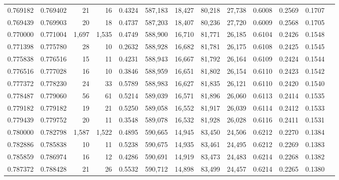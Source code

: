\begin{tabular}{rrrrrrrrrrrrr}
0.769182 & 0.769402 &     21 &    16 &                                     0.4324 & 587,183 &  18,427 &  80,218 &  27,738 & 0.6008 & 0.2569 & 0.1707 \\
0.769439 & 0.769903 &     20 &    18 &                                     0.4737 & 587,203 &  18,407 &  80,236 &  27,720 & 0.6009 & 0.2568 & 0.1705 \\
0.770000 & 0.771004 &  1,697 & 1,535 &                                     0.4749 & 588,900 &  16,710 &  81,771 &  26,185 & 0.6104 & 0.2426 & 0.1548 \\
0.771398 & 0.775780 &     28 &    10 &                                     0.2632 & 588,928 &  16,682 &  81,781 &  26,175 & 0.6108 & 0.2425 & 0.1545 \\
0.775838 & 0.776516 &     15 &    11 &                                     0.4231 & 588,943 &  16,667 &  81,792 &  26,164 & 0.6109 & 0.2424 & 0.1544 \\
0.776516 & 0.777028 &     16 &    10 &                                     0.3846 & 588,959 &  16,651 &  81,802 &  26,154 & 0.6110 & 0.2423 & 0.1542 \\
0.777372 & 0.778230 &     24 &    33 &                                     0.5789 & 588,983 &  16,627 &  81,835 &  26,121 & 0.6110 & 0.2420 & 0.1540 \\
0.778487 & 0.779060 &     56 &    61 &                                     0.5214 & 589,039 &  16,571 &  81,896 &  26,060 & 0.6113 & 0.2414 & 0.1535 \\
0.779182 & 0.779182 &     19 &    21 &                                     0.5250 & 589,058 &  16,552 &  81,917 &  26,039 & 0.6114 & 0.2412 & 0.1533 \\
0.779439 & 0.779752 &     20 &    11 &                                     0.3548 & 589,078 &  16,532 &  81,928 &  26,028 & 0.6116 & 0.2411 & 0.1531 \\
0.780000 & 0.782798 &  1,587 & 1,522 &                                     0.4895 & 590,665 &  14,945 &  83,450 &  24,506 & 0.6212 & 0.2270 & 0.1384 \\
0.782886 & 0.785838 &     10 &    11 &                                     0.5238 & 590,675 &  14,935 &  83,461 &  24,495 & 0.6212 & 0.2269 & 0.1383 \\
0.785859 & 0.786974 &     16 &    12 &                                     0.4286 & 590,691 &  14,919 &  83,473 &  24,483 & 0.6214 & 0.2268 & 0.1382 \\
0.787372 & 0.788428 &     21 &    26 &                                     0.5532 & 590,712 &  14,898 &  83,499 &  24,457 & 0.6214 & 0.2265 & 0.1380 \\

\end{tabular}
